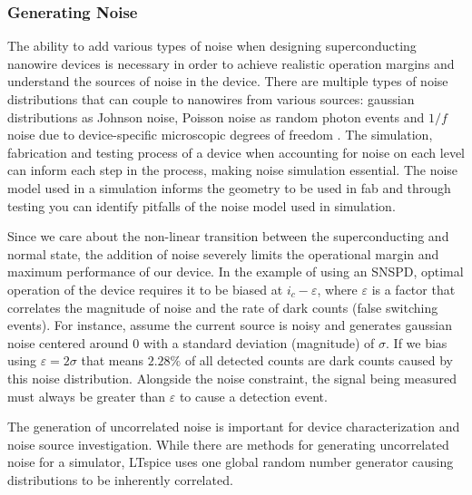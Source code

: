 

\subsubsection{Generating Noise} \label{gen_noise}


The ability to add various types of noise when designing superconducting nanowire devices is necessary in order to achieve realistic operation margins and understand the sources of noise in the device. There are multiple types of noise distributions that can couple to nanowires from various sources: gaussian distributions as Johnson noise, Poisson noise
as random photon events and $1/f$ noise due to device-specific microscopic degrees of freedom \cite{1overfinsc}. The simulation, fabrication and testing process of a device
when accounting for noise on each level can inform each step in the process, making noise
simulation essential. The noise model used in a simulation informs the geometry to be 
used in fab and through testing you can identify pitfalls of the noise model used
in simulation.


Since we care about the non-linear transition between
the superconducting and normal state, the addition of noise severely limits the operational margin and
maximum performance of our device. In the example of using an SNSPD, optimal operation of the device 
requires it to be biased at $i_c-\varepsilon$, where $\varepsilon$ is a factor that correlates the 
magnitude of noise and the rate of dark counts (false switching events). For instance, assume the current source is noisy and generates
gaussian noise centered around $0$ with a standard deviation (magnitude) of $\sigma$.
If we bias using $\varepsilon = 2\sigma$ that means $2.28\%$ of all detected counts are dark counts caused by this noise distribution.
Alongside the noise constraint, the signal being measured 
must always be greater than $\varepsilon$ to cause a detection event.

The generation of uncorrelated noise is important for device characterization and
noise source investigation.
While there are methods for generating uncorrelated noise for a simulator, 
LTspice uses one global random number generator causing distributions to be 
inherently correlated.

